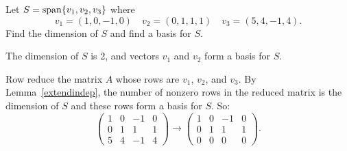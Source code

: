 \documentclass{ximera}
\begin{document}
\begin{exercise} \label{c5.5.2}
Let $S={\rm span}\{v_1,v_2,v_3\}$ where
\[
v_1=(1,0,-1,0) \quad v_2=(0,1,1,1) \quad v_3=(5,4,-1,4).
\]
Find the dimension of $S$ and find a basis for $S$.

\begin{solution}

\ans The dimension of $S$ is 2, and vectors $v_1$ and $v_2$ form a
basis for $S$.

\soln Row reduce the matrix $A$ whose rows are $v_1$, $v_2$, and $v_3$. 
By Lemma~\ref{extendindep}, the number
of nonzero rows in the reduced matrix is the dimension of $S$ and these
rows form a basis for $S$.  So:
\[
\left(\begin{array}{rrrr} 1 & 0 & -1 & 0 \\ 0 & 1 & 1 & 1 \\ 5
& 4 & -1 & 4 \end{array}\right) \longrightarrow \left(\begin{array}
{rrrr} 1& 0 & -1 & 0 \\ 0 & 1 & 1 & 1 \\ 0 & 0 & 0 & 0
\end{array}\right).
\]

\end{solution}
\end{exercise}




\problemlabel
\end{document}
